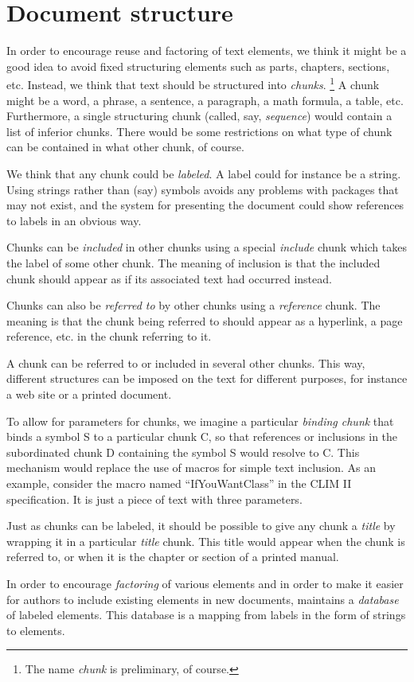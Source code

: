 \chapter{Document structure}
\label{chap-document-structure}

In order to encourage reuse and factoring of text elements, we think
it might be a good idea to avoid fixed structuring elements such as
parts, chapters, sections, etc.  Instead, we think that text should be
structured into \emph{chunks}.%
\footnote{The name \emph{chunk} is preliminary, of course.}
A chunk might be a word, a phrase, a sentence, a paragraph, a math
formula, a table, etc.  Furthermore, a single structuring chunk
(called, say, \emph{sequence}) would contain a list of inferior
chunks.  There would be some restrictions on what type of chunk can be
contained in what other chunk, of course.  

We think that any chunk could be \emph{labeled}.  A label could for
instance be a \commonlisp{} string.  Using strings rather than (say)
symbols avoids any problems with packages that may not exist, and the
system for presenting the document could show references to labels in
an obvious way.

Chunks can be \emph{included} in other chunks using a special
\emph{include} chunk which takes the label of some other chunk.
The meaning of inclusion is that the included chunk should appear as
if its associated text had occurred instead.  

Chunks can also be \emph{referred to} by other chunks using a
\emph{reference} chunk.  The meaning is that the chunk being referred
to should appear as a hyperlink, a page reference, etc. in the chunk
referring to it. 

A chunk can be referred to or included in several other chunks.  This
way, different structures can be imposed on the text for different
purposes, for instance a web site or a printed document. 

To allow for parameters for chunks, we imagine a particular
\emph{binding chunk} that binds a symbol S to a particular chunk C, so
that references or inclusions in the subordinated chunk D containing
the symbol S would resolve to C.  This mechanism would replace the use
of macros for simple text inclusion.  As an example, consider the
macro named ``IfYouWantClass'' in the CLIM II specification.  It is
just a piece of text with three parameters. 

Just as chunks can be labeled, it should be possible to give any chunk
a \emph{title} by wrapping it in a particular \emph{title} chunk.
This title would appear when the chunk is referred to, or when it is
the chapter or section of a printed manual.

In order to encourage \emph{factoring} of various elements and in
order to make it easier for authors to include existing elements in
new documents, \sysname{} maintains a \emph{database} of labeled
elements.  This database is a mapping from labels in the form of
\commonlisp{} strings to elements.
